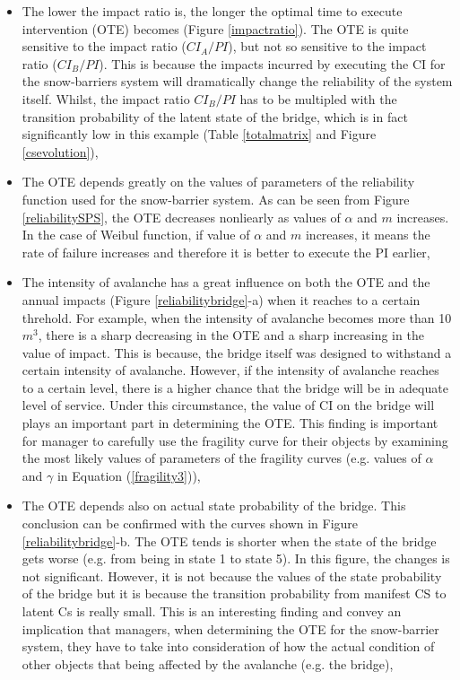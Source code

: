 \documentclass[fleqn]{article}
\begin{document}
\begin{itemize}
 \item The lower the impact ratio is, the longer the optimal time to execute intervention (OTE) becomes (Figure \ref{impactratio}). The OTE is quite sensitive to the impact ratio ($CI_A/PI$), but not so sensitive to the impact ratio ($CI_B/PI$). This is because the impacts incurred by executing the CI for the snow-barriers system will dramatically change the reliability of the system itself. Whilst, the impact ratio $CI_B/PI$ has to be multipled with the transition probability of the latent state of the bridge, which is in fact significantly low in this example (Table \ref{totalmatrix} and Figure \ref{csevolution}),
 \item The OTE depends greatly on the values of parameters of the reliability function used for the snow-barrier system. As can be seen from Figure \ref{reliabilitySPS}, the OTE decreases nonliearly as values of $\alpha$ and $m$ increases. In the case of Weibul function, if value of $\alpha$ and $m$ increases, it means the rate of failure increases and therefore it is better to execute the PI earlier,
 \item The intensity of avalanche has a great influence on both the OTE and the annual impacts (Figure \ref{reliabilitybridge}-a) when it reaches to a certain threhold. For example, when the intensity of avalanche becomes more than 10 $m^3$, there is a sharp decreasing in the OTE and a sharp increasing in the value of impact. This is because, the bridge itself was designed to withstand a certain intensity of avalanche. However, if the intensity of avalanche reaches to a certain level, there is a higher chance that the bridge will be in adequate level of service. Under this circumstance, the value of CI on the bridge will plays an important part in determining the OTE. This finding is important for manager to carefully use the fragility curve for their objects by examining the most likely values of parameters of the fragility curves (e.g. values of $\alpha$ and $\gamma$ in Equation (\ref{fragility3})),
 \item The OTE depends also on actual state probability of the bridge. This conclusion can be confirmed with the curves shown in Figure \ref{reliabilitybridge}-b. The OTE tends is shorter when the state of the bridge gets worse (e.g. from being in state 1 to state 5). In this figure, the changes is not significant. However, it is not because the values of the state probability of the bridge but it is because the transition probability from manifest CS to latent Cs is really small. This is an interesting finding and convey an implication that managers, when determining the OTE for the snow-barrier system, they have to take into consideration of how the actual condition of other objects that being affected by the avalanche (e.g. the bridge),

\end{itemize}
\end{document}
